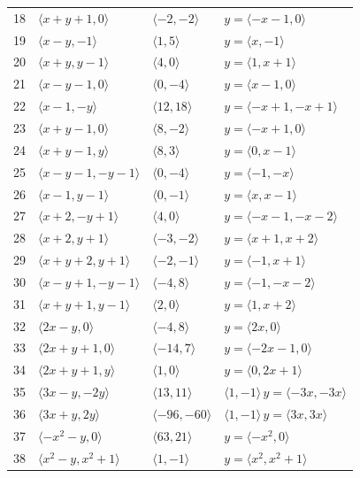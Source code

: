 \documentclass[11pt]{article}
\begin{document}
\begin{longtable}{@{}rlll@{}}
18 & $\langle x+y+1,0\rangle$ & $\langle -2,-2\rangle$ & $y=\langle -x-1,0\rangle$\\
19 & $\langle x-y,-1\rangle$ & $\langle 1,5\rangle$ & $y=\langle x,-1\rangle$\\
20 & $\langle x+y,y-1\rangle$ & $\langle 4,0\rangle$ & $y=\langle 1,x+1\rangle$\\
21 & $\langle x-y-1,0\rangle$ & $\langle 0,-4\rangle$ & $y=\langle x-1,0\rangle$\\
22 & $\langle x-1,-y\rangle$ & $\langle 12,18\rangle$ & $y=\langle -x+1,-x+1\rangle$\\
23 & $\langle x+y-1,0\rangle$ & $\langle 8,-2\rangle$ & $y=\langle -x+1,0\rangle$\\
24 & $\langle x+y-1,y\rangle$ & $\langle 8,3\rangle$ & $y=\langle 0,x-1\rangle$\\
25 & $\langle x-y-1,-y-1\rangle$ & $\langle 0,-4\rangle$ & $y=\langle -1,-x\rangle$\\
26 & $\langle x-1,y-1\rangle$ & $\langle 0,-1\rangle$ & $y=\langle x,x-1\rangle$\\
27 & $\langle x+2,-y+1\rangle$ & $\langle 4,0\rangle$ & $y=\langle -x-1,-x-2\rangle$\\
28 & $\langle x+2,y+1\rangle$ & $\langle -3,-2\rangle$ & $y=\langle x+1,x+2\rangle$\\
29 & $\langle x+y+2,y+1\rangle$ & $\langle -2,-1\rangle$ & $y=\langle -1,x+1\rangle$\\
30 & $\langle x-y+1,-y-1\rangle$ & $\langle -4,8\rangle$ & $y=\langle -1,-x-2\rangle$\\
31 & $\langle x+y+1,y-1\rangle$ & $\langle 2,0\rangle$ & $y=\langle 1,x+2\rangle$\\
32 & $\langle 2x-y,0\rangle$ & $\langle -4,8\rangle$ & $y=\langle 2x,0\rangle$\\
33 & $\langle 2x+y+1,0\rangle$ & $\langle -14,7\rangle$ & $y=\langle -2x-1,0\rangle$\\
34 & $\langle 2x+y+1,y\rangle$ & $\langle 1,0\rangle$ & $y=\langle 0,2x+1\rangle$\\
35 & $\langle 3x-y,-2y\rangle$ & $\langle 13,11\rangle$ & $\langle 1,-1\rangle\,y=\langle -3x,-3x\rangle$\\
36 & $\langle 3x+y,2y\rangle$ & $\langle -96,-60\rangle$ & $\langle 1,-1\rangle\,y=\langle 3x,3x\rangle$\\
37 & $\langle -x^{2}-y,0\rangle$ & $\langle 63,21\rangle$ & $y=\langle -x^{2},0\rangle$\\
38 & $\langle x^{2}-y,x^{2}+1\rangle$ & $\langle 1,-1\rangle$ & $y=\langle x^{2},x^{2}+1\rangle$\\

\end{longtable}
\end{document}
